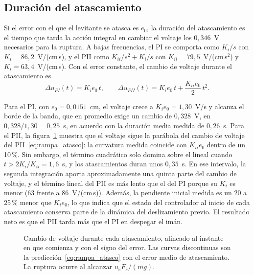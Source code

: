 \subsection{Duración del atascamiento}

Si el error con el que el levitante se atasca es $e_0$, la duración del atascamiento es el tiempo que tarda la acción integral en cambiar el voltaje los $0{,}346$~V necesarios para la ruptura. A bajas frecuencias, el PI se comporta como $K_i/s$ con $K_i=86{,}2$~V/(cm\,s), y el PII como $K_{ii}/s^2 + K_i/s$ con $K_{ii}=79{,}5$~V/(cm\,s$^2$) y $K_i=63{,}4$~V/(cm\,s). Con el error constante, el cambio de voltaje durante el atascamiento es
\begin{equation}
\Delta u_{PI}(t) = K_i e_0\, t, \qquad
\Delta u_{PII}(t) = K_i e_0\, t + \frac{K_{ii} e_0}{2}\, t^2 .
\label{eq:rampa_atasco}
\end{equation}

Para el PI, con $e_0=0{,}0151$~cm, el voltaje crece a $K_i e_0 = 1{,}30$~V/s y alcanza el borde de la banda, que en promedio exige un cambio de $0{,}328$~V, en $0{,}328/1{,}30=0{,}25$~s, en acuerdo con la duración media medida de $0{,}26$~s. Para el PII, la figura~\ref{fig:atasco} muestra que el voltaje sigue la parábola del cambio de voltaje del PII~\eqref{eq:rampa_atasco}: la curvatura medida coincide con $K_{ii}e_0$ dentro de un 10\,\%. Sin embargo, el término cuadrático solo domina sobre el lineal cuando $t > 2K_i/K_{ii} = 1{,}6$~s, y los atascamientos duran unos $0{,}35$~s. En ese intervalo, la segunda integración aporta aproximadamente una quinta parte del cambio de voltaje, y el término lineal del PII es más lento que el del PI porque su $K_i$ es menor (63 frente a 86~V/(cm\,s)). Además, la pendiente inicial medida es un 20 a 25\,\% menor que $K_i e_0$, lo que indica que el estado del controlador al inicio de cada atascamiento conserva parte de la dinámica del deslizamiento previo. El resultado neto es que el PII tarda más que el PI en despegar el imán.

\begin{figure}[ht]
    \centering
    
    \caption[Voltaje durante el atascamiento]{Cambio de voltaje durante cada atascamiento, alineado al instante en que comienza y con el signo del error. Las curvas discontinuas son la predicción~\eqref{eq:rampa_atasco} con el error medio de atascamiento. La ruptura ocurre al alcanzar $u_eF_s/(mg)$.}
    \label{fig:atasco}
\end{figure}

